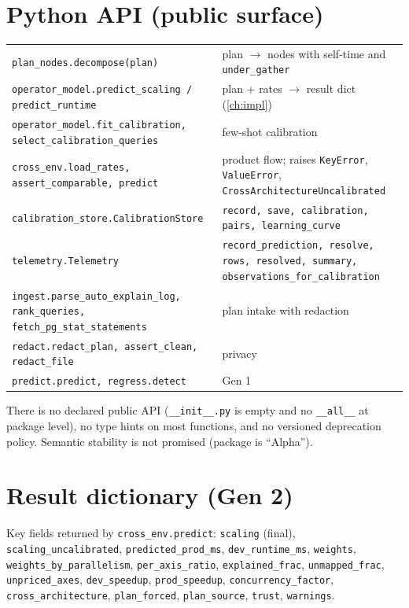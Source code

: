 \section{Python API (public surface)}
\begin{center}\small
\begin{tabularx}{\textwidth}{@{}L{5.4cm}Y@{}}
\toprule {} & \\ \midrule
\texttt{plan\_nodes.decompose(plan)} & plan $\to$ nodes with self-time and \texttt{under\_gather}\\
\texttt{operator\_model.predict\_scaling / predict\_runtime} & plan + rates $\to$ result dict (\cref{ch:impl})\\
\texttt{operator\_model.fit\_calibration, select\_calibration\_queries} & few-shot calibration\\
\texttt{cross\_env.load\_rates, assert\_comparable, predict} & product flow; raises \texttt{KeyError}, \texttt{ValueError}, \texttt{CrossArchitectureUncalibrated}\\
\texttt{calibration\_store.CalibrationStore} & \texttt{record, save, calibration, pairs, learning\_curve}\\
\texttt{telemetry.Telemetry} & \texttt{record\_prediction, resolve, rows, resolved, summary, observations\_for\_calibration}\\
\texttt{ingest.parse\_auto\_explain\_log, rank\_queries, fetch\_pg\_stat\_statements} & plan intake with redaction\\
\texttt{redact.redact\_plan, assert\_clean, redact\_file} & privacy\\
\texttt{predict.predict, regress.detect} & Gen 1\\
\bottomrule
\end{tabularx}
\end{center}
There is no declared public API (\texttt{\_\_init\_\_.py} is empty and no \texttt{\_\_all\_\_} at package level), no type hints on most functions, and no versioned deprecation policy. Semantic stability is not promised (package is ``Alpha'').

\section{Result dictionary (Gen 2)}
Key fields returned by \texttt{cross\_env.predict}: \texttt{scaling} (final), \texttt{scaling\_uncalibrated}, \texttt{predicted\_prod\_ms}, \texttt{dev\_runtime\_ms}, \texttt{weights}, \texttt{weights\_by\_parallelism},
\texttt{per\_axis\_ratio}, \texttt{explained\_frac}, \texttt{unmapped\_frac}, \texttt{unpriced\_axes}, \texttt{dev\_speedup}, \texttt{prod\_speedup}, \texttt{concurrency\_factor}, \texttt{cross\_architecture},
\texttt{plan\_forced}, \texttt{plan\_source}, \texttt{trust}, \texttt{warnings}.

